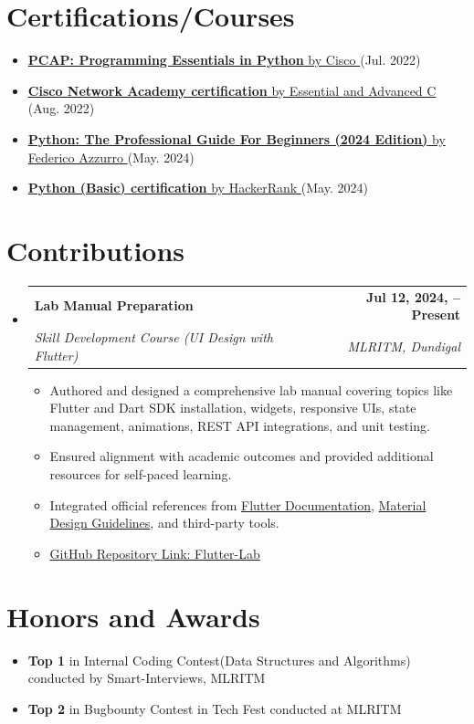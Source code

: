 \documentclass[a4paper,11pt]{article}
\makeatletter
\newcommand{\resumeItem}[1]{\item\small{{#1 \vspace{-2pt}}}}
\newcommand{\resumeSubheading}[4]{
  \vspace{-2pt}\item
    \begin{tabular*}{0.97\textwidth}[t]{l@{\extracolsep{\fill}}r}
      \textbf{#1} & \textbf{\small #2} \\
      \textit{\small#3} & \textit{\small #4} \\
    \end{tabular*}\vspace{-7pt}
}
\newcommand{\resumeSubHeadingListStart}{\begin{itemize}[leftmargin=0.15in, label={}]}
\newcommand{\resumeSubHeadingListEnd}{\end{itemize}}
\newcommand{\resumeItemListStart}{\begin{itemize}}
\newcommand{\resumeItemListEnd}{\end{itemize}\vspace{-5pt}}
\makeatother
\begin{document}
\vspace{-3pt}
  \section{Certifications/Courses}
    \resumeItemListStart[parsep = 0pt]
      \resumeItem{\href{https://drive.google.com/file/d/1ciuy0EC8fBujuxVOcZ--oUG9OZ8eHr5D/view?usp=drive_link}
                        {\textbf{PCAP: Programming Essentials in Python} by Cisco \faExternalLink*} (Jul. 2022)}
      \resumeItem{\href{https://drive.google.com/file/d/1w72XSRwblf5AqqEBGvnUbvUayJTcpWO-/view?usp=drive_link}
                        {\textbf{Cisco Network Academy certification} by Essential and Advanced C \faExternalLink*} (Aug. 2022)}
      \resumeItem{\href{https://www.udemy.com/certificate/UC-79138624-8361-423b-b131-42765a08db12/}
                        {\textbf{Python: The Professional Guide For Beginners (2024 Edition)} by \href{https://www.linkedin.com/in/federicoazzu/}{Federico Azzurro} \faExternalLink*} (May. 2024)}
      \resumeItem{\href{https://www.hackerrank.com/certificates/607a2d4d88f1}
                        {\textbf{Python (Basic) certification} by HackerRank \faExternalLink*} (May. 2024)}
    \resumeItemListEnd

\section{Contributions}
  \resumeSubHeadingListStart
    \resumeSubheading
      {Lab Manual Preparation}{Jul 12, 2024, -- Present}
      {Skill Development Course (UI Design with Flutter)}{MLRITM, Dundigal}
      \resumeItemListStart
        \resumeItem{Authored and designed a comprehensive lab manual covering topics like Flutter and Dart SDK installation, widgets, responsive UIs, state management, animations, REST API integrations, and unit testing.}
        \resumeItem{Ensured alignment with academic outcomes and provided additional resources for self-paced learning.}
        \resumeItem{Integrated official references from \href{https://flutter.dev}{Flutter Documentation}, \href{https://material.io}{Material Design Guidelines}, and third-party tools.}
          \resumeItem{\href{https://github.com/srinu2003/Flutter-Lab}{GitHub Repository Link: Flutter-Lab}}
              \resumeItemListEnd
          \resumeSubHeadingListEnd

\vspace{-11pt}
\section{Honors and Awards}
  \resumeItemListStart[parsep = -2pt]
    \resumeItem{\textbf{Top 1} in Internal Coding Contest(Data Structures and Algorithms) conducted by Smart-Interviews, MLRITM}
    \resumeItem{\textbf{Top 2} in Bugbounty Contest in Tech Fest conducted at MLRITM}
  \resumeItemListEnd

\end{document}
